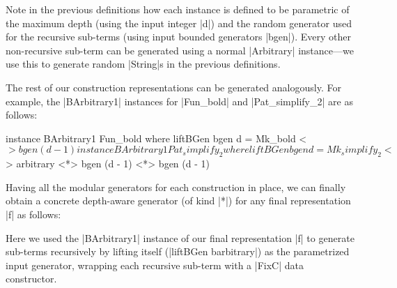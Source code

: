 Note in the previous definitions how each instance is defined to be parametric
of the maximum depth (using the input integer |d|) and the random generator used
for the recursive sub-terms (using input bounded generators |bgen|).
%
Every other non-recursive sub-term can be generated using a normal |Arbitrary|
instance---we use this to generate random |String|s in the previous definitions.


The rest of our construction representations can be generated analogously.
%
For example, the |BArbitrary1| instances for |Fun_bold| and |Pat_simplify_2| are
as follows:

\begin{code}
instance BArbitrary1 Fun_bold where
  liftBGen bgen d = Mk_bold <$> bgen (d - 1)

instance BArbitrary1 Pat_simplify_2 where
  liftBGen bgen d = Mk_simplify_2
    <$> arbitrary <*> bgen (d - 1) <*> bgen (d - 1)
\end{code} %







Having all the modular generators for each construction in place, we can finally
obtain a concrete depth-aware generator (of kind |*|) for any final
representation |f| as follows:


Here we used the |BArbitrary1| instance of our final representation |f| to
generate sub-terms recursively by lifting itself (|liftBGen barbitrary|) as the
parametrized input generator, wrapping each recursive sub-term with a |FixC|
data constructor.

